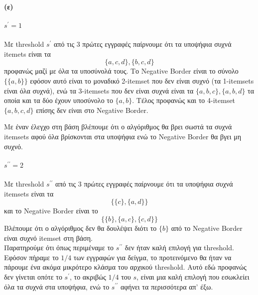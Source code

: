 \documentclass[a4paper,11pt]{article}
\begin{document}
\paragraph{(ε)}
\subparagraph{$s^\prime=1$} Με threshold $s^\prime$ από τις 3 πρώτες εγγραφές παίρνουμε ότι τα υποψήφια συχνά itemets είναι τα
\[ \{a,c,d\},\{b,c,d\} \]
προφανώς μαζί με όλα τα υποσύνολά τους.
Το Negative Border είναι το σύνολο $\{ \{a,b\} \}$ εφόσον αυτό είναι το μοναδικό 2-itemset που δεν είναι συχνό (τα 1-itemsets είναι όλα συχνά), ενώ τα 3-itemsets που δεν είναι συχνά είναι τα $\{a,b,c\},\{a,b,d\}$ τα οποία και τα δύο έχουν υποσύνολο το $\{a,b\}$.
Τέλος προφανώς και το 4-itemset $\{a,b,c,d\}$ επίσης δεν είναι στο Negative Border.

Με έναν έλεγχο στη βάση βλέπουμε ότι ο αλγόριθμος θα βρει σωστά τα συχνά itemsets αφού όλα βρίσκονται στα υποψήφια ενώ το Negative Border θα βγει μη συχνό.

\subparagraph{$s^{\prime\prime}=2$} Με threshold $s^{\prime\prime}$ από τις 3 πρώτες εγγραφές παίρνουμε ότι τα υποψήφια συχνά itemsets είναι τα
\[ \{ \{c\},\{a,d\} \} \]
και το Negative Border είναι το
\[ \{ \{b\},\{a,c\},\{c,d\} \} \]
Βλέπουμε ότι ο αλγόριθμος δεν θα δουλέψει διότι το $\{b\}$ από το Negative Border είναι συχνό itemset στη βάση.
\\[8pt]
Παρατηρούμε ότι όπως περιμέναμε το $s^{\prime\prime}$ δεν ήταν καλή επιλογή για threshold.
Εφόσον πήραμε το $1/4$ των εγγραφών για δείγμα, το προτεινόμενο θα ήταν να πάρουμε ένα ακόμα μικρότερο κλάσμα του αρχικού threshold.
Αυτό εδώ προφανώς δεν γίνεται οπότε το $s^\prime$, το ακριβώς $1/4$ του $s$, είναι μια καλή επιλογή που εσωκλείει όλα τα συχνά στα υποψήφια, ενώ το $s^{\prime\prime}$ αφήνει τα περισσότερα απ' έξω.
\end{document}
